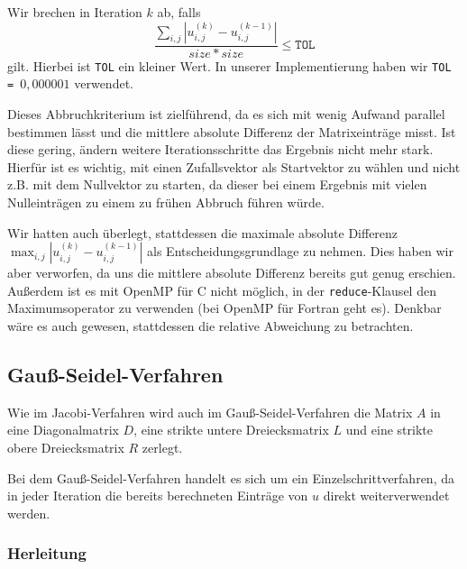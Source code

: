 \documentclass{article}
\begin{document}
Wir brechen in Iteration $k$ ab, falls
$$\frac{\sum_{i,j} {| u_{i,j}^{(k)} - u_{i,j}^{(k-1)} |}}{size * size} \leq \texttt{TOL}$$
gilt. Hierbei ist \texttt{TOL} ein kleiner Wert. In unserer Implementierung haben wir \texttt{TOL = $0,000001$} verwendet.

Dieses Abbruchkriterium ist zielführend, da es sich mit wenig Aufwand parallel bestimmen lässt und die mittlere absolute Differenz der Matrixeinträge misst. Ist diese gering, ändern weitere Iterationsschritte das Ergebnis nicht mehr stark. Hierfür ist es wichtig, mit einen Zufallsvektor als Startvektor zu wählen und nicht z.B. mit dem Nullvektor zu starten, da dieser bei einem Ergebnis mit vielen Nulleinträgen zu einem zu frühen Abbruch führen würde.

Wir hatten auch überlegt, stattdessen die maximale absolute Differenz $\max_{i,j} {| u_{i,j}^{(k)} - u_{i,j}^{(k-1)} |}$ als Entscheidungsgrundlage zu nehmen. Dies haben wir aber verworfen, da uns die mittlere absolute Differenz bereits gut genug erschien. Außerdem ist es mit OpenMP für C nicht möglich, in der \texttt{reduce}-Klausel den Maximumsoperator zu verwenden (bei OpenMP für Fortran geht es). Denkbar wäre es auch gewesen, stattdessen die relative Abweichung zu betrachten.

\subsection{Gauß-Seidel-Verfahren}
Wie im Jacobi-Verfahren wird auch im Gauß-Seidel-Verfahren die Matrix $A$ in eine Diagonalmatrix $D$, eine strikte untere Dreiecksmatrix $L$ und eine strikte obere Dreiecksmatrix $R$ zerlegt.

Bei dem Gauß-Seidel-Verfahren handelt es sich um ein Einzelschrittverfahren, da in jeder Iteration die bereits  berechneten Einträge von $u$ direkt weiterverwendet werden.
\subsubsection{Herleitung}
\end{document}

